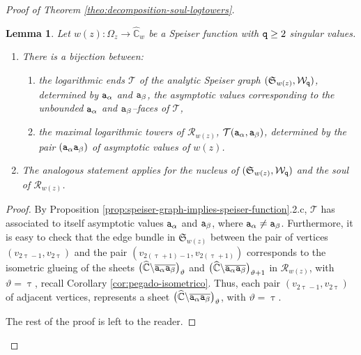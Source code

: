 \documentclass[final,3p,times]{elsarticle}
\newcommand{\CW}{\ensuremath{{\widehat{\mathbb C}}}}
\newcommand{\R}{\ensuremath{{\mathcal R}}}
\newtheorem{lemma}[theorem]{Lemma}
\theoremstyle{definition}
\begin{document}
\begin{proof}[Proof of Theorem \ref{theo:decomposition-soul-logtowers}]
\begin{lemma}
\label{lem:correspondence-log-towers}
Let $w(z):\Omega_z \longrightarrow \CW_w$ be a Speiser function with ${\tt q }\geq 2$ singular values.


\begin{enumerate}[label=\arabic*),leftmargin=*]
\item
There is a bijection between:

\begin{enumerate}[label=\roman*),leftmargin=*]
\item
the logarithmic ends $\mathcal{T}$ of the analytic Speiser graph
$(\mathfrak{S}_{w(z)},\mathcal{W}_{\tt q})$, 
determined by  ${\tt a}_\alpha$ and ${\tt a}_\beta$, the asymptotic values corresponding to 
the unbounded ${\tt a}_\alpha$  and ${\tt a}_\beta$--faces 
of $\mathcal{T}$,

\item
the maximal logarithmic towers of $\R_{w(z)}$, 
$\mathcal{T} ({\tt a}_\alpha, {\tt a}_\beta ) $,   
determined by the pair $({\tt a}_\alpha {\tt a}_\beta)$ of asymptotic values of $w(z)$.
\end{enumerate}

\item
The analogous statement applies for the nucleus of $(\mathfrak{S}_{w(z)},\mathcal{W}_{\tt q})$
and the soul of $\R_{w(z)}$.
\end{enumerate}
\end{lemma}

\begin{proof}
By Proposition \ref{prop:speiser-graph-implies-speiser-function}.2.c, 
$\mathcal{T}$ has associated to itself
asymptotic values ${\tt a}_\alpha$ and ${\tt a}_\beta$, 
where ${\tt a}_\alpha\neq{\tt a}_\beta$. 
Furthermore, it is easy to check that the edge bundle in $\mathfrak{S}_{w(z)}$ between the pair of vertices  
$(v_{2\uptau -1}, v_{2\uptau})$ and the pair $(v_{2(\uptau +1)-1}, v_{2(\uptau +1)})$ corresponds to 
the isometric glueing of the sheets
$\big( \CW\backslash \overline{ {\tt a}_{\alpha} {\tt a}_{\beta} } \big)_{\vartheta}$ 
and $\big( \CW\backslash \overline{ {\tt a}_{\alpha} {\tt a}_{\beta} } \big)_{\vartheta +1}$ 
in $\R_{w(z)}$, 
with $\vartheta = \uptau$,
recall Corollary \ref{cor:pegado-isometrico}.
Thus, each pair $ (v_{2\uptau -1}, v_{2 \uptau} )$ of adjacent vertices, represents
a sheet
$\big( \CW\backslash \overline{ {\tt a}_{\alpha} {\tt a}_{\beta} } \big)_{\vartheta }$,
with $\vartheta = \uptau$.

\noindent
The rest of the proof is left to the reader.
\end{proof}


\end{proof}
\end{document}
